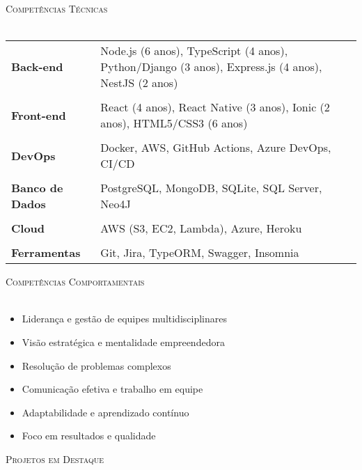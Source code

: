 \documentclass[a4paper]{article}
\newcommand{\lineunder}{
    \vspace*{-8pt} \\
    \hspace*{-18pt} \hrulefill \\
}
\newcommand{\header}[1]{
    {\hspace*{-18pt}\vspace*{6pt} \textsc{#1}}
    \vspace*{-6pt} \lineunder
}
\newcommand{\skillrow}[2]{
    \textbf{#1} & #2 \\
}
\begin{document}
%
%
\header{Competências Técnicas}
\vspace{2mm}
\begin{longtable}{p{4cm}p{12cm}}
    \skillrow{Back-end}{Node.js (6 anos), TypeScript (4 anos), Python/Django (3 anos), Express.js (4 anos), NestJS (2 anos)}\\
    \skillrow{Front-end}{React (4 anos), React Native (3 anos), Ionic (2 anos), HTML5/CSS3 (6 anos)}\\
    \skillrow{DevOps}{Docker, AWS, GitHub Actions, Azure DevOps, CI/CD}\\
    \skillrow{Banco de Dados}{PostgreSQL, MongoDB, SQLite, SQL Server, Neo4J}\\
    \skillrow{Cloud}{AWS (S3, EC2, Lambda), Azure, Heroku}\\
    \skillrow{Ferramentas}{Git, Jira, TypeORM, Swagger, Insomnia}
\end{longtable}
\vspace{1mm}

%
%
\header{Competências Comportamentais}
\vspace{2mm}
\begin{itemize}[leftmargin=*]
    \item Liderança e gestão de equipes multidisciplinares
    \item Visão estratégica e mentalidade empreendedora
    \item Resolução de problemas complexos
    \item Comunicação efetiva e trabalho em equipe
    \item Adaptabilidade e aprendizado contínuo
    \item Foco em resultados e qualidade
\end{itemize}
\vspace{2mm}

%
%
\header{Projetos em Destaque}
\vspace{1mm}
\end{document}

